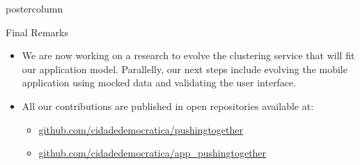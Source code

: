 \documentclass[final,hyperref={pdfpagelabels=false}]{beamer}
\begin{document}
\begin{frame}
\begin{columns}
\begin{column}{.49\textwidth}
\begin{beamercolorbox}[center,wd=\textwidth]{postercolumn}
\begin{minipage}[T]{.95\textwidth}
{\begin{block}{Final Remarks}
\begin{itemize}
    \item We are now working on a research to evolve the clustering service that
    will fit our application model. Parallelly, our next steps include evolving the
    mobile application using mocked data and validating the user interface.

    \item All our contributions are published in open repositories available at:
      \begin{itemize}
        \item \url{github.com/cidadedemocratica/pushingtogether}
        \item \url{github.com/cidadedemocratica/app_pushingtogether}
      \end{itemize}
  \end{itemize}
\end{block}
      }
        \end{minipage}
      \end{beamercolorbox}
    \end{column}
  \end{columns}
\end{frame}
\end{document}
